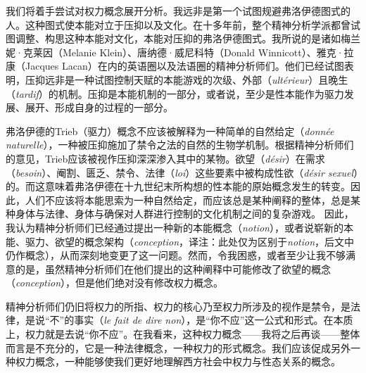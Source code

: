 \documentclass[fontset=fandol, a4paper, 12pt, twoside]{ctexart}
\renewenvironment{quote}
  {\list{}{\rightmargin=0cm \leftmargin=2em}%
   \item\relax\small\kaishu\color{black}}
  {\endlist}
\newcommand{\fr}[1]{\textit{#1}}
\begin{document}
    
    



我们将着手尝试对权力概念展开分析。我远非是第一个试图规避弗洛伊德图式的人。这种图式使本能对立于压抑以及文化。在十多年前，整个精神分析学派都曾试图调整、构思这种本能对文化，本能对压抑的弗洛伊德图式。我所说的是诸如梅兰妮·克莱因（Melanie Klein）、唐纳德·威尼科特（Donald Winnicott）、雅克·拉康（Jacques Lacan）在内的英语圈以及法语圈的精神分析师们。他们已经试图表明，压抑远非是一种试图控制天赋的本能游戏的次级、外部（\fr{ultérieur}）且晚生（\fr{tardif}）的机制。压抑是本能机制的一部分，或者说，至少是性本能作为驱力发展、展开、形成自身的过程的一部分。

弗洛伊德的Trieb（驱力）概念不应该被解释为一种简单的自然给定（\fr{donnée naturelle}），一种被压抑施加了禁令之法的自然的生物学机制。根据精神分析师们的意见，Trieb应该被视作压抑深深渗入其中的某物。欲望（\fr{désir}）在需求（\fr{besoin}）、阉割、匮乏、禁令、法律（\fr{loi}）这些要素中被构成性欲（\fr{désir sexuel}）的。而这意味着弗洛伊德在十九世纪末所构想的性本能的原始概念发生的转变。因此，人们不应该将本能思索为一种自然给定，而应该总是某种阐释的整体，总是某种身体与法律、身体与确保对人群进行控制的文化机制之间的复杂游戏。
因此，我认为精神分析师们已经通过提出一种新的本能概念（\fr{notion}），或者说崭新的本能、驱力、欲望的概念架构（\fr{conception}，译注：此处仅为区别于\fr{notion}，后文中仍作概念），从而深刻地变更了这一问题。然而，令我困惑，或者至少让我不够满意的是，虽然精神分析师们在他们提出的这种阐释中可能修改了欲望的概念（\fr{conception}），但是他们绝对没有修改权力概念。

精神分析师们仍旧将权力的所指、权力的核心乃至权力所涉及的视作是禁令，是法律，是说“不”的事实（\fr{le fait de dire non}），是“你不应”这一公式和形式。在本质上，权力就是去说“你不应”。在我看来，这种权力概念——我将之后再谈——整体而言是不充分的，它是一种法律概念，一种权力的形式概念。我们应该促成另外一种权力概念，一种能够使我们更好地理解西方社会中权力与性态关系的概念。
\end{document}
